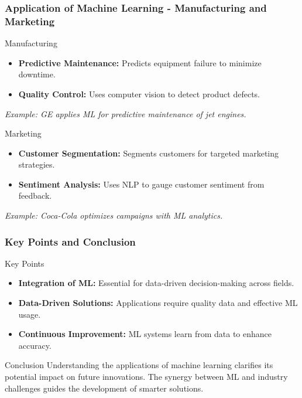 \documentclass[aspectratio=169]{beamer}
\begin{document}
\begin{frame}[fragile]
    \frametitle{Application of Machine Learning - Manufacturing and Marketing}
    \begin{block}{Manufacturing}
        \begin{itemize}
            \item \textbf{Predictive Maintenance:} Predicts equipment failure to minimize downtime.
            \item \textbf{Quality Control:} Uses computer vision to detect product defects.
        \end{itemize}
        \textit{Example: GE applies ML for predictive maintenance of jet engines.}
    \end{block}

    \begin{block}{Marketing}
        \begin{itemize}
            \item \textbf{Customer Segmentation:} Segments customers for targeted marketing strategies.
            \item \textbf{Sentiment Analysis:} Uses NLP to gauge customer sentiment from feedback.
        \end{itemize}
        \textit{Example: Coca-Cola optimizes campaigns with ML analytics.}
    \end{block}
\end{frame}

\begin{frame}[fragile]
    \frametitle{Key Points and Conclusion}
    \begin{block}{Key Points}
        \begin{itemize}
            \item \textbf{Integration of ML:} Essential for data-driven decision-making across fields.
            \item \textbf{Data-Driven Solutions:} Applications require quality data and effective ML usage.
            \item \textbf{Continuous Improvement:} ML systems learn from data to enhance accuracy.
        \end{itemize}
    \end{block}

    \begin{block}{Conclusion}
        Understanding the applications of machine learning clarifies its potential impact on future innovations. 
        The synergy between ML and industry challenges guides the development of smarter solutions.
    \end{block}
\end{frame}
\end{document}
